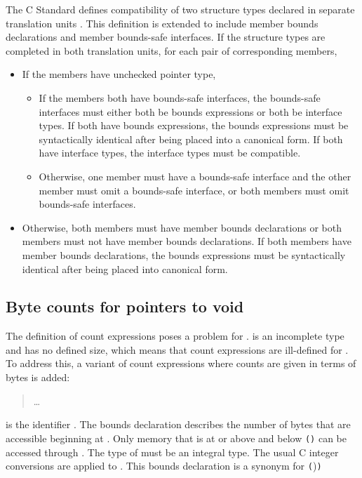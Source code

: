 The C Standard defines compatibility of two structure types declared in
separate translation units \cite[Section 6.2.7]{ISO2011}.  This definition
is extended to include member bounds declarations and member bounds-safe
interfaces.  If the structure types are completed in both translation
units, for each pair of corresponding members,
\begin{itemize}
\item If the members have unchecked pointer type,
\begin{itemize}
\item If the members both have bounds-safe interfaces, the bounds-safe
interfaces must either both be bounds expressions or both be interface
types. If both have bounds expressions, the bounds expressions must be
syntactically identical after being placed into a canonical form.
If both have interface types, the interface types must be compatible.
\item Otherwise,  one member must have a bounds-safe interface and the
other member must omit a bounds-safe interface, or both members must omit
bounds-safe interfaces.
\end{itemize}
\item Otherwise, both members must have member bounds declarations or both
members must not have member bounds declarations.  If both members have
member bounds declarations, the bounds expressions must be syntactically
identical after being placed into canonical form.
\end{itemize}

\subsection{Byte counts for pointers to void}
\label{section:pointers-to-void}

The definition of count expressions poses a problem for
\arrayptrvoid.  is an
incomplete type and has no defined size, which means that count
expressions are ill-defined for
\arrayptrvoid. To address this, a
variant of count expressions where counts are given in terms of bytes is
added:


\begin{quote}
\ldots{}

\end{quote}

 is the identifier .
The bounds declaration 
describes the number of bytes that are accessible beginning at .
Only memory that is at or above  and below
\lstinline|(|\arrayptrchar\lstinline|)|  \code{+}  can be accessed through
. The type of  must be an integral type.  The usual C integer conversions are
applied to .  This bounds declaration is a synonym for
           {
                      {\lstinline|(|\arrayptrchar)\lstinline|)|  \code{+} }
                      {}}

